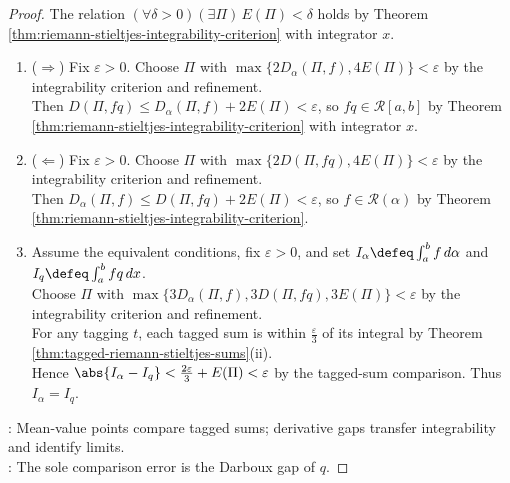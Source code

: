 \begin{theorem}
\begin{proof}
The relation $(\forall\delta>0)(\exists\Pi)\,E(\Pi)<\delta$ holds by Theorem \ref{thm:riemann-stieltjes-integrability-criterion} with integrator $x$.
\begin{enumerate}[label=(\roman*)]
\setlength{\itemsep}{0pt}
\item[$(i)$] ($\Rightarrow$) Fix $\varepsilon>0$. Choose $\Pi$ with $\max\{2D_\alpha(\Pi,f),4E(\Pi)\}<\varepsilon$ by the integrability criterion and refinement.\\
Then $D(\Pi,fq)\leq D_\alpha(\Pi,f)+2E(\Pi)<\varepsilon$, so $fq\in\mathcal{R}[a,b]$ by Theorem \ref{thm:riemann-stieltjes-integrability-criterion} with integrator $x$.
\item[$(i)$] ($\Leftarrow$) Fix $\varepsilon>0$. Choose $\Pi$ with $\max\{2D(\Pi,fq),4E(\Pi)\}<\varepsilon$ by the integrability criterion and refinement.\\
Then $D_\alpha(\Pi,f)\leq D(\Pi,fq)+2E(\Pi)<\varepsilon$, so $f\in\mathcal{R}(\alpha)$ by Theorem \ref{thm:riemann-stieltjes-integrability-criterion}.
\item[$(ii)$] Assume the equivalent conditions, fix $\varepsilon>0$, and set $I_\alpha\defeq\int_a^b f\,d\alpha$ and $I_q\defeq\int_a^b fq\,dx$.\\
Choose $\Pi$ with $\max\{3D_\alpha(\Pi,f),3D(\Pi,fq),3E(\Pi)\}<\varepsilon$ by the integrability criterion and refinement.\\
For any tagging $t$, each tagged sum is within $\frac{\varepsilon}{3}$ of its integral by Theorem \ref{thm:tagged-riemann-stieltjes-sums}(ii).\\
Hence $\abs{I_\alpha-I_q}<\frac{2\varepsilon}{3}+E(\Pi)<\varepsilon$ by the tagged-sum comparison. Thus $I_\alpha=I_q$.
\end{enumerate}
: Mean-value points compare tagged sums; derivative gaps transfer integrability and identify limits.\\
: The sole comparison error is the Darboux gap of $q$.
\end{proof}
\end{theorem}

